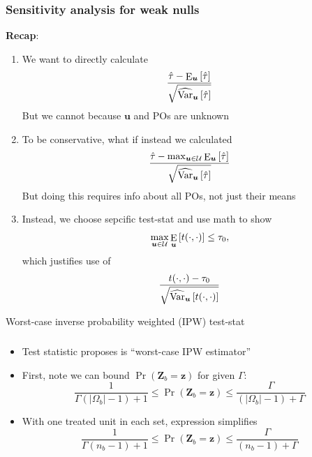 \documentclass[table, xcolor = {dvipsnames}, 9pt]{beamer}
\theoremstyle{plain}
\DeclareMathOperator{\E}{\rm{E}}
\DeclareMathOperator{\Var}{\rm{Var}}
\begin{document}
\begin{frame}[t]
\frametitle{Sensitivity analysis for weak nulls} 
\vfill
\textbf{Recap}: \vfill
\begin{enumerate} \vfill
\item We want to directly calculate 
\begin{align*}
\frac{\hat{\tau} - \E_{\bm{u}}\left[\hat{\tau}\right]}{\sqrt{\widehat{\Var}_{\bm{u}}\left[\hat{\tau}\right]}}
\end{align*} \vfill
But we cannot because $\bm{u}$ and POs are unknown \vfill
\item To be conservative, what if instead we calculated 
\begin{equation*}
\dfrac{\hat{\tau} - \max_{\bm{u} \in \mathcal{U}} \E_{\bm{u}}\left[\hat{\tau}\right]}{\sqrt{\widehat{\Var}_{\bm{u}}\left[\hat{\tau}\right]}}
\end{equation*} \vfill
But doing this requires info about all POs, not just their means \vfill
\item Instead, we choose sepcific test-stat and use math to show \vfill
\begin{align*}
\max \limits_{\bm{u} \in \mathcal{U}} \E_{\bm{u}}\left[t(\cdot, \cdot)\right] \leq \tau_0,
\end{align*} \vfill
which justifies use of
\begin{equation*}
\dfrac{t(\cdot, \cdot) - \tau_0}{\sqrt{\widehat{\Var}_{\bm{u}}\left[t(\cdot, \cdot)\right]}}
\end{equation*} \vfill
\end{enumerate}
\vfill
\end{frame}
\begin{frame}[t]{Worst-case inverse probability weighted (IPW) test-stat}
\frametitle{} 
\vfill
\begin{itemize} \vfill
\item Test statistic \citet{fogarty2020} proposes is ``worst-case IPW estimator'' \vfill
\item First, note we can bound $\Pr\left(\bm{Z}_b = \bm{z}\right)$ for given $\Gamma$:
\begin{equation*}
\dfrac{1}{\Gamma(\left\lvert \Omega_b \right \rvert - 1) + 1} \leq \Pr(\bm{Z}_b = \bm{z}) \leq \dfrac{\Gamma}{(\left\lvert \Omega_b \right \rvert - 1) + \Gamma}
\end{equation*}
\vfill
\item With one treated unit in each set, expression simplifies \vfill
\begin{equation*}
\dfrac{1}{\Gamma(n_b - 1) + 1} \leq \Pr(\bm{Z}_b = \bm{z}) \leq \dfrac{\Gamma}{(n_b - 1) + \Gamma}
\end{equation*} \vfill
\end{itemize}  
\vfill
\end{frame}
\end{document}
